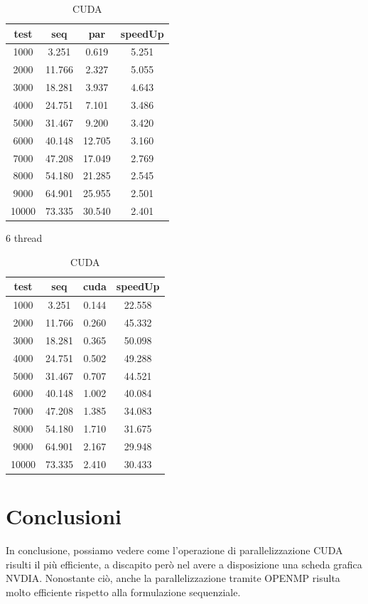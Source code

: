 \documentclass[11pt]{article}
\begin{document}
    \begin{table}
        \begin{minipage}{0.49\textwidth}
            \begin{tabular}{|c|c|c|c|}
            \hline
            test & seq & par & speedUp\\
            \hline
            1000 & 3.251 & 0.619 & 5.251 \\
            2000 & 11.766 & 2.327 & 5.055 \\
            3000 & 18.281 & 3.937 & 4.643 \\
            4000 & 24.751 & 7.101 & 3.486 \\
            5000 & 31.467 & 9.200 & 3.420 \\
            6000 & 40.148 & 12.705 & 3.160 \\
            7000 & 47.208 & 17.049 & 2.769 \\
            8000 & 54.180 & 21.285 & 2.545 \\
            9000 & 64.901 & 25.955 & 2.501 \\
            10000 & 73.335 & 30.540 & 2.401 \\
            \hline
            \end{tabular}
            \caption{6 thread}
        \end{minipage}
        \hfill
        \begin{minipage}{0.49\textwidth}
            \begin{tabular}{|c|c|c|c|}
                \hline
                test & seq & cuda & speedUp\\
                \hline
                1000 & 3.251 & 0.144 & 22.558 \\
                2000 & 11.766 & 0.260 & 45.332 \\
                3000 & 18.281 & 0.365 & 50.098 \\
                4000 & 24.751 & 0.502 & 49.288 \\
                5000 & 31.467 & 0.707 & 44.521 \\
                6000 & 40.148 & 1.002 & 40.084 \\
                7000 & 47.208 & 1.385 & 34.083 \\
                8000 & 54.180 & 1.710 & 31.675 \\
                9000 & 64.901 & 2.167 & 29.948 \\
                10000 & 73.335 & 2.410 & 30.433 \\
                \hline
            \end{tabular}
            \caption{CUDA}
        \end{minipage}\label{tab:table2}
    \end{table}

    \section{Conclusioni}\label{sec:conclusioni}
    In conclusione, possiamo vedere come l'operazione di parallelizzazione CUDA risulti il più efficiente, a
    discapito però nel avere a disposizione una scheda grafica NVDIA\@.
    Nonostante ciò, anche la parallelizzazione tramite OPENMP risulta molto efficiente rispetto alla formulazione
    sequenziale.
\end{document}
